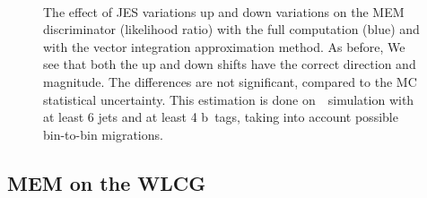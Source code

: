 \begin{figure}[ht]
\begin{centering}
\\
\caption[The full variation in the MEM discriminator]{The effect of JES variations up and down variations on the MEM discriminator (likelihood ratio) with the full computation (blue) and with the vector integration approximation method. As before, We see that both the up and down shifts have the correct direction and magnitude. The differences are not significant, compared to the MC statistical uncertainty. This estimation is done on~\ttHbb~simulation with at least 6 jets and at least 4 b~tags, taking into account possible bin-to-bin migrations.}
\label{fig:jes_variation_ratio}
\end{centering}
\end{figure}

\subsection{MEM on the WLCG}

